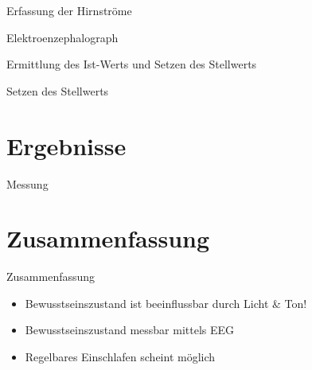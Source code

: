 \documentclass[hyperref={pdfpagelabels=false}]{beamer}
\begin{document}
\begin{frame}{Erfassung der Hirnströme}
\begin{center}
\end{center}
\vspace{1cm}
\end{frame}


\begin{frame}{Elektroenzephalograph}
\begin{center}
\end{center}
\vspace{1cm}
\end{frame}


\begin{frame}{Ermittlung des Ist-Werts und Setzen des Stellwerts}
\begin{center}
\end{center}
\vspace{1cm}
\end{frame}


\begin{frame}{Setzen des Stellwerts}
\begin{center}
\end{center}
\vspace{1cm}
\end{frame}


\section{Ergebnisse}
\begin{frame}{Messung}
\begin{center}
\end{center}
\vspace{1cm}
\end{frame}


\section*{Zusammenfassung}
\begin{frame}{Zusammenfassung}
  \begin{itemize}
  \item \begin{large}Bewusstseinszustand ist beeinflussbar durch Licht \& Ton!\end{large}
  \item \begin{large}Bewusstseinszustand messbar mittels EEG\end{large}
  \item \begin{large}Regelbares Einschlafen scheint möglich\end{large}
  \end{itemize}
\vspace{1cm}
\end{frame}
\end{document}
